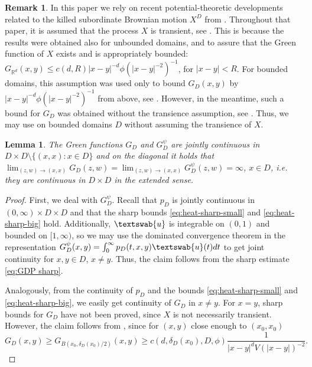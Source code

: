 \documentclass[12pt,a4paper,onecolumn]{article}
\newtheorem{lem}[thm]{Lemma}
\theoremstyle{definition}
\newtheorem{rem}[thm]{Remark}
\newcommand{\R}{\mathbb{R}}
\newcommand{\1}{\mathbf 1}
\newcommand{\de}{\delta_D}
\newcommand{\GDP}{G_D^\psi}
\newcommand{\GD}{G_{ D}}
\newcommand{\uu}{\textswab{u}}
\numberwithin{equation}{section}
\begin{document}
    \begin{rem}\label{r:Bio21jmaa}
        In this paper we rely on recent potential-theoretic developments related to the killed subordinate Brownian motion $X^D$ from \cite{Bio21jmaa}. Throughout that paper, it is assumed that the process $X$ is transient, see \cite[Subsection 2.4]{Bio21jmaa}. This is because the results were obtained also for unbounded domains, and to assure that the Green function of $X$ exists and is appropriately bounded: $G_{\R^d}(x,y)\le c(d,R)|x-y|^{-d}\phi(|x-y|^{-2})^{-1}$, for $|x-y|<R$. For bounded domains, this assumption was used only to bound $G_D(x,y)$ by $|x-y|^{-d}\phi(|x-y|^{-2})^{-1}$ from above, see \cite[p.9, and Eqs. (38) and (39)]{Bio21jmaa}. However, in the meantime, such a bound for $G_D$ was obtained without the transience assumption, see \cite[Lemma 2.1]{ksv2020boundary}. Thus, we may use \cite{Bio21jmaa} on bounded domains $D$ without assuming the transience of $X$.
    \end{rem}

    \begin{lem}\label{l:GDP cont}
        The Green functions  $G_D$ and $\GDP$ are  jointly continuous in $D\times D \setminus \{(x,x):x\in D\}$ and on the diagonal it holds that $\lim_{(z,w)\to(x,x)}\GD(z,w)=\lim_{(z,w)\to(x,x)}\GDP(z,w)=\infty$, $x\in D$,
        i.e. they are continuous in $D\times D$ in the extended sense.
    \end{lem}
    \begin{proof}
        First, we deal with $\GDP$. Recall that $p_D$ is jointly continuous in $(0,\infty)\times D\times D$ and that the sharp bounds \eqref{eq:heat-sharp-small} and \eqref{eq:heat-sharp-big} hold. Additionally, $\uu$ is integrable on $(0,1)$ and bounded on $[1,\infty)$, so we may use the dominated convergence theorem in the representation $\GDP(x,y)=\int_0^\infty p_D(t,x,y)\uu(t)dt$ to get joint continuity for $x,y\in D$, $x\ne y$. Thus, the claim follows from the sharp estimate \eqref{eq:GDP sharp}.

        Analogously, from the continuity of $p_D$ and the bounds \eqref{eq:heat-sharp-small} and \eqref{eq:heat-sharp-big}, we easily get continuity of $G_D$ in $x\ne y$. For $x=y$, sharp bounds for $G_D$ have not been proved, since $X$ is not necessarily transient. However, the claim follows from \cite[last display on p. 137]{ksv2020boundary}, since for $(x,y)$ close enough to $(x_0,x_0)$
        $$G_D(x,y)\ge G_{B(x_0,\de(x_0)/2)}(x,y)\ge c(d,\de(x_0),D,\phi)\frac{1}{|x-y|^dV(|x-y|)^{-2}}.$$ 
    \end{proof}
  
\end{document}
